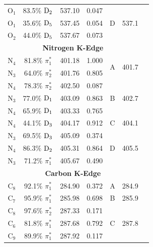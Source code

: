 \documentclass[8.5pt,twoside,twocolumn]{article}
\begin{document}
\begin{table}[!t]
\begin{tabular*}{8.5cm}{@{\extracolsep{\fill} }cccrccc}
    O$_1$
 &   83.5$\%$ $\rm D_2$  & 537.10 & 0.047 & \multirow{3}{*}{D} & \multirow{3}{*}{537.1} \\
    O$_1$
 &   35.6$\%$ $\rm D_5$  & 537.45 & 0.054 \\
    O$_2$
 &   44.0$\%$ $\rm D_5$  & 537.67 & 0.073 \vspace{0.05in}\\
  \multicolumn{6}{c}{\textbf{Nitrogen K-Edge}} \vspace{0.05in}\\
     N$_4$
 &   81.8$\%$ $\pi_1^*$  & 401.18 & 1.000 & \multirow{2}{*}{A} & \multirow{2}{*}{401.7} \\
    N$_3$
 &   64.0$\%$ $\pi_2^*$  & 401.76 & 0.805 
 \vspace{0.05in}\\
    N$_4$
 &   78.3$\%$ $\pi_2^*$  & 402.50 & 0.087 & \multirow{3}{*}{B} & \multirow{3}{*}{402.7}\\
    N$_3$
 &   77.0$\%$ $\rm D_1$  & 403.09 & 0.863 \\
    N$_4$
 &   65.9$\%$ $\rm D_1$  & 403.33 & 0.765 
 \vspace{0.05in}\\
    N$_4$
 &   44.1$\%$ $\rm D_3$  & 404.17 & 0.912 & C & 404.1 
 \vspace{0.05in}\\
    N$_3$
 &   69.5$\%$ $\rm D_3$  & 405.09 & 0.374  & \multirow{3}{*}{D} & \multirow{3}{*}{405.5} \\
    N$_4$
 &   86.3$\%$ $\rm D_2$  & 405.31 & 0.864 \\
    N$_3$
 &   71.2$\%$ $\pi_1^*$  & 405.67 & 0.490 \vspace{0.05in}\\
   \multicolumn{6}{c}{\textbf{Carbon K-Edge}} \vspace{0.05in}\\
       C$_8$
 &   92.1$\%$ $\pi_1^*$  & 284.90 & 0.372 & A & 284.9  
 \vspace{0.05in} \\
    C$_7$
 &   95.9$\%$ $\pi_1^*$  & 285.98 & 0.698 & B & 285.9
 \vspace{0.05in} \\
    C$_8$
 &   97.6$\%$ $\pi_2^*$  & 287.33 & 0.171   & \multirow{3}{*}{C} & \multirow{3}{*}{287.8}  \\
    C$_6$
 &   81.8$\%$ $\pi_1^*$  & 287.68 & 0.792 \\
    C$_9$
 &   89.9$\%$ $\pi_1^*$  & 287.92 & 0.117  
 \vspace{0.05in}  \\

\end{tabular*}
\end{table}
\end{document}

